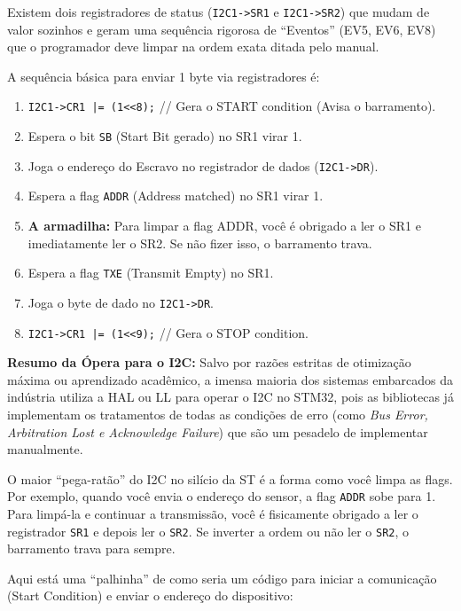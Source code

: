 \documentclass[12pt,a4paper]{article}
\begin{document}
Existem dois registradores de status (\texttt{I2C1->SR1} e \texttt{I2C1->SR2}) que mudam de valor sozinhos e geram uma sequência rigorosa de ``Eventos'' (EV5, EV6, EV8) que o programador deve limpar na ordem exata ditada pelo manual.

A sequência básica para enviar 1 byte via registradores é:
\begin{enumerate}
    \item \texttt{I2C1->CR1 |= (1<<8);} // Gera o START condition (Avisa o barramento).
    \item Espera o bit \texttt{SB} (Start Bit gerado) no SR1 virar 1.
    \item Joga o endereço do Escravo no registrador de dados (\texttt{I2C1->DR}).
    \item Espera a flag \texttt{ADDR} (Address matched) no SR1 virar 1.
    \item \textbf{A armadilha:} Para limpar a flag ADDR, você é obrigado a ler o SR1 e imediatamente ler o SR2. Se não fizer isso, o barramento trava.
    \item Espera a flag \texttt{TXE} (Transmit Empty) no SR1.
    \item Joga o byte de dado no \texttt{I2C1->DR}.
    \item \texttt{I2C1->CR1 |= (1<<9);} // Gera o STOP condition.
\end{enumerate}

\textbf{Resumo da Ópera para o I2C:} Salvo por razões estritas de otimização máxima ou aprendizado acadêmico, a imensa maioria dos sistemas embarcados da indústria utiliza a HAL ou LL para operar o I2C no STM32, pois as bibliotecas já implementam os tratamentos de todas as condições de erro (como \textit{Bus Error, Arbitration Lost e Acknowledge Failure}) que são um pesadelo de implementar manualmente.

O maior ``pega-ratão'' do I2C no silício da ST é a forma como você limpa as flags. Por exemplo, quando você envia o endereço do sensor, a flag \texttt{ADDR} sobe para 1. Para limpá-la e continuar a transmissão, você é fisicamente obrigado a ler o registrador \texttt{SR1} e depois ler o \texttt{SR2}. Se inverter a ordem ou não ler o \texttt{SR2}, o barramento trava para sempre.

Aqui está uma ``palhinha'' de como seria um código para iniciar a comunicação (Start Condition) e enviar o endereço do dispositivo:
\end{document}
